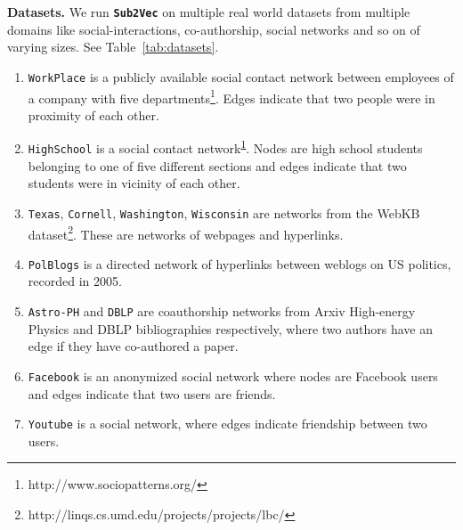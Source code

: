 \documentclass[sigconf]{acmart}
\newcommand{\alg}{{\bf {\tt Sub2Vec}}\xspace}
\newcommand{\workplace}{{\tt WorkPlace}\xspace}
\newcommand{\highschool}{{\tt HighSchool}\xspace}
\newcommand{\dblp}{{\tt DBLP}\xspace}
\newcommand{\youtube}{{\tt Youtube}\xspace}
\newcommand{\polblogs}{{\tt PolBlogs}\xspace}
\newcommand{\texas}{{\tt Texas}\xspace}
\newcommand{\wisconsin}{{\tt Wisconsin}\xspace}
\newcommand{\washington}{{\tt Washington}\xspace}
\newcommand{\cornell}{{\tt Cornell}\xspace}
\newcommand{\facebook}{{\tt Facebook}\xspace}
\newcommand{\arxiv}{{\tt Astro-PH}\xspace}
\begin{document}
\par \noindent
\textbf{Datasets.} We run \alg on multiple real world datasets from multiple domains like social-interactions, co-authorship, social networks and so on of varying sizes. See Table~\ref{tab:datasets}.
\begin{enumerate}[wide, labelwidth=!, labelindent=0pt, itemsep=0pt,nolistsep]
\item  \workplace is a publicly available social contact network between employees of a company with five departments\footnote{\protect\label{note1}http://www.sociopatterns.org/}\!. Edges indicate that two people were in proximity of each other. 
 
 \item \highschool is a social contact network\textsuperscript{\normalfont\ref{note1}}\!. Nodes are high school students belonging to one of five different sections and edges indicate that two students were in vicinity of each other.  

\item \texas, \cornell, \washington, \wisconsin are networks from the WebKB dataset\footnote{http://linqs.cs.umd.edu/projects/projects/lbc/}\!. These are networks of webpages and hyperlinks.   

\item \polblogs is a directed network of hyperlinks between weblogs on US politics, recorded in 2005. 

\item \arxiv and \dblp are coauthorship networks from Arxiv High-energy Physics and DBLP bibliographies respectively, where two authors have an edge if they have co-authored a paper. 

\item \facebook \cite{leskovec2012learning} is an anonymized social network where nodes are Facebook users  and edges indicate that two users are friends.

\item \youtube is a social network, where edges indicate friendship between two users. 

\end{enumerate}
\end{document}
